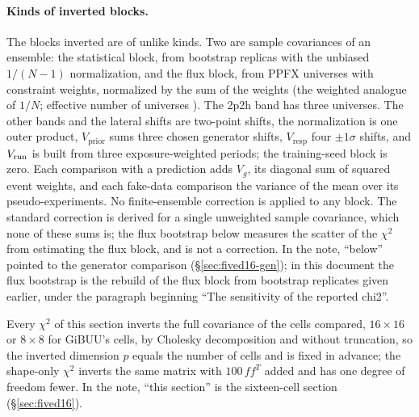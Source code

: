 \paragraph{Kinds of inverted blocks.} The blocks inverted are of unlike kinds. Two are sample covariances of an ensemble: the statistical block, from  bootstrap replicas with the unbiased $1/(N-1)$ normalization, and the flux block, from  PPFX universes with constraint weights, normalized by the sum of the weights (the weighted analogue of $1/N$; effective number of universes ). The 2p2h band has three universes. The other bands and the lateral shifts are two-point shifts, the normalization is one outer product, $V_{\mathrm{prior}}$ sums three chosen generator shifts, $V_{\mathrm{resp}}$ four $\pm1\sigma$ shifts, and $V_{\mathrm{run}}$ is built from three exposure-weighted periods; the training-seed block is zero. Each comparison with a prediction adds $V_g$, its diagonal sum of squared event weights, and each fake-data comparison the variance of the mean over its pseudo-experiments. No finite-ensemble correction is applied to any block. The standard correction is derived for a single unweighted sample covariance, which none of these sums is; the flux bootstrap below measures the scatter of the $\chi^2$ from estimating the flux block, and is not a correction. In the note, ``below'' pointed to the generator comparison (\S\ref{sec:fived16-gen}); in this document the flux bootstrap is the rebuild of the flux block from bootstrap replicates given earlier, under the paragraph beginning ``The sensitivity of the reported chi2''.\par Every $\chi^2$ of this section inverts the full covariance of the cells compared, $16\times16$ or $8\times8$ for GiBUU's cells, by Cholesky decomposition and without truncation, so the inverted dimension $p$ equals the number of cells and is fixed in advance; the shape-only $\chi^2$ inverts the same matrix with $100\,f f^{T}$ added and has one degree of freedom fewer. In the note, ``this section'' is the sixteen-cell section (\S\ref{sec:fived16}).\par
